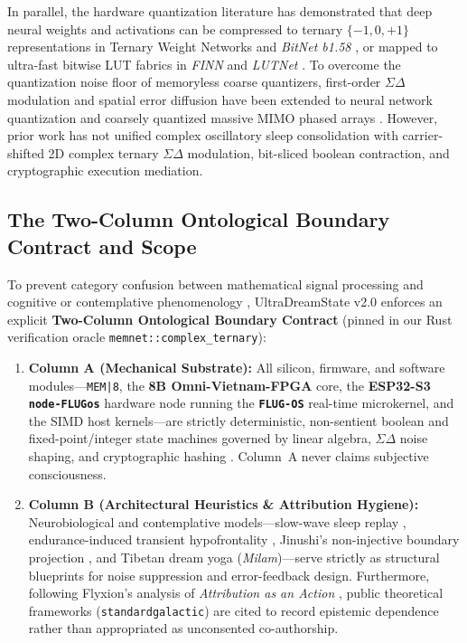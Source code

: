 \documentclass[10pt, twocolumn, a4paper]{article}
\begin{document}
In parallel, the hardware quantization literature has demonstrated that deep neural weights and activations can be compressed to ternary $\{-1, 0, +1\}$ representations in Ternary Weight Networks \cite{li2016ternary} and \textit{BitNet b1.58} \cite{ma2024era}, or mapped to ultra-fast bitwise LUT fabrics in \textit{FINN} \cite{umuroglu2017finn} and \textit{LUTNet} \cite{wang2019lutnet}. To overcome the quantization noise floor of memoryless coarse quantizers, first-order $\Sigma\Delta$ modulation \cite{inose1962unity} and spatial error diffusion \cite{floyd1976adaptive} have been extended to neural network quantization \cite{oconnor2017sigmadelta, zhang2019sigmadelta} and coarsely quantized massive MIMO phased arrays \cite{shao2019spatial}. However, prior work has not unified complex oscillatory sleep consolidation with carrier-shifted 2D complex ternary $\Sigma\Delta$ modulation, bit-sliced boolean contraction, and cryptographic execution mediation.

\subsection{The Two-Column Ontological Boundary Contract and Scope}
To prevent category confusion between mathematical signal processing and cognitive or contemplative phenomenology \cite{spencerbrown1969laws, guimond2026persistence, guimond2026witness}, UltraDreamState v2.0 enforces an explicit \textbf{Two-Column Ontological Boundary Contract} (pinned in our Rust verification oracle \texttt{memnet::complex\_ternary}):
\begin{enumerate}
    \item \textbf{Column A (Mechanical Substrate):} All silicon, firmware, and software modules---\texttt{MEM|8}, the \textbf{8B Omni-Vietnam-FPGA} core, the \textbf{ESP32-S3 \texttt{node-FLUGos}} hardware node running the \textbf{\texttt{FLUG-OS}} real-time microkernel, and the SIMD host kernels---are strictly deterministic, non-sentient boolean and fixed-point/integer state machines governed by linear algebra, $\Sigma\Delta$ noise shaping, and cryptographic hashing \cite{oconnor2020blake3, mccanne1993bsd}. Column~A never claims subjective consciousness.
    \item \textbf{Column B (Architectural Heuristics \& Attribution Hygiene):} Neurobiological and contemplative models---slow-wave sleep replay \cite{diekelmann2010memory}, endurance-induced transient hypofrontality \cite{dietrich2003functional}, Jinushi's non-injective boundary projection \cite{jinushi2022supermarket}, and Tibetan dream yoga (\textit{Milam})---serve strictly as structural blueprints for noise suppression and error-feedback design. Furthermore, following Flyxion's analysis of \textit{Attribution as an Action} \cite{flyxion2026permissions, austin1962how, ali2006restatement}, public theoretical frameworks (\texttt{standardgalactic}) are cited to record epistemic dependence rather than appropriated as unconsented co-authorship.
\end{enumerate}
\end{document}
